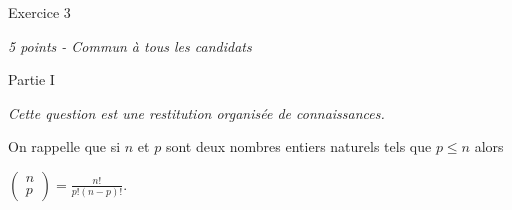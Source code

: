 
%
\begin{h2}Exercice 3\end{h2}
\textit{5 points - Commun à tous les candidats}
\begin{h3}Partie I\end{h3}
\textit{Cette question est une restitution organisée de connaissances. }
\par
On rappelle que si $n$ et $p$ sont deux nombres entiers naturels tels que $p \leqslant n$ alors

\begin{center}
$\begin{pmatrix} n \\ p \end{pmatrix}=\frac{n!}{p!\left(n-p\right)!}$.
\end{center}

